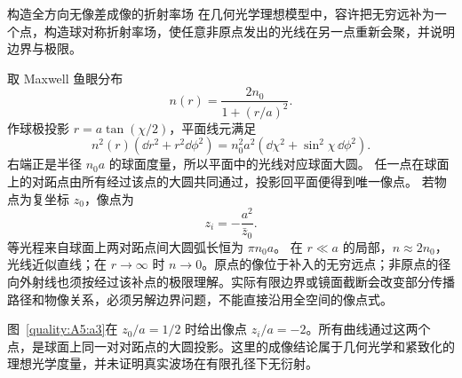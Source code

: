 \begin{advexamplebox}{构造全方向无像差成像的折射率场}\label{advA5:ex:maxwell-fisheye}
在几何光学理想模型中，容许把无穷远补为一个点，构造球对称折射率场，使任意非原点发出的光线在另一点重新会聚，并说明边界与极限。

\end{advexamplebox}
\begin{advsolution}
取 Maxwell 鱼眼分布
\[
 \boxed{n(r)=\frac{2n_0}{1+(r/a)^2}}.
\]
作球极投影 $r=a\tan(\chi/2)$，平面线元满足
\[
 n^2(r)(\dd r^2+r^2\dd\phi^2)
 =n_0^2a^2(\dd\chi^2+\sin^2\chi\,\dd\phi^2).
\]
右端正是半径 $n_0a$ 的球面度量，所以平面中的光线对应球面大圆。
任一点在球面上的对跖点由所有经过该点的大圆共同通过，投影回平面便得到唯一像点。
若物点为复坐标 $z_0$，像点为
\[
 \boxed{z_i=-\frac{a^2}{\bar z_0}}.
\]
等光程来自球面上两对跖点间大圆弧长恒为 $\pi n_0a$。
在 $r\ll a$ 的局部，$n\approx2n_0$，光线近似直线；在 $r\to\infty$ 时
$n\to0$。原点的像位于补入的无穷远点；非原点的径向外射线也须按经过该补点的极限理解。实际有限边界或镜面截断会改变部分传播路径和物像关系，必须另解边界问题，不能直接沿用全空间的像点式。


图~\ref{quality:A5:a3}在 $z_0/a=1/2$ 时给出像点 $z_i/a=-2$。所有曲线通过这两个点，是球面上同一对对跖点的大圆投影。这里的成像结论属于几何光学和紧致化的理想光学度量，并未证明真实波场在有限孔径下无衍射。
\end{advsolution}

